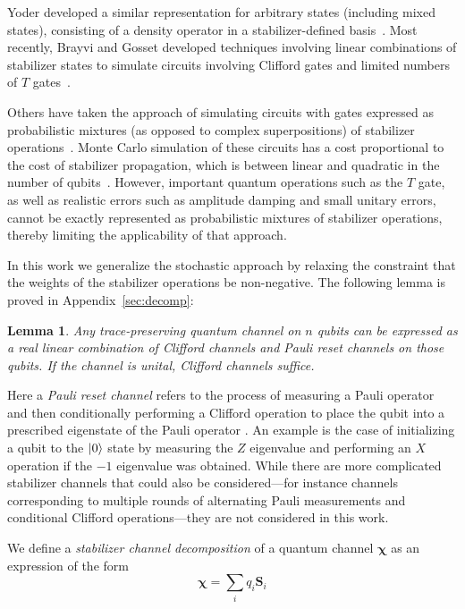 \documentclass[twocolumn,pra]{revtex4}
\newtheorem{lemma}{Lemma}
\newcommand{\bs}[1]{\boldsymbol{#1}}
\begin{document}
Yoder developed a similar representation for arbitrary states (including mixed states), consisting of a density operator in a stabilizer-defined basis~\cite{Yoder2012}. Most recently, Brayvi and Gosset developed techniques involving linear combinations of stabilizer states to simulate circuits involving Clifford gates and limited numbers of $T$ gates~\cite{bravyi2016improved}. 
\par
Others have taken the approach of simulating circuits with gates expressed as probabilistic mixtures (as opposed to complex superpositions) of stabilizer operations~\cite{Gutierrez2013, Magesan2013,Puzzuoli2014,Gutierrez2015}. Monte Carlo simulation of these circuits has a cost proportional to the cost of stabilizer propagation, which is between linear and quadratic in the number of qubits~\cite{Aaronson2004}. However, important quantum operations such as the $T$ gate, as well as realistic errors such as amplitude damping and small unitary errors, cannot be exactly represented as probabilistic mixtures of stabilizer operations, thereby limiting the applicability of that approach.
\par
In this work we generalize the stochastic approach by relaxing the constraint that the weights of the stabilizer operations be non-negative. The following lemma is proved in Appendix~\ref{sec:decomp}:
\begin{lemma}
\label{thm:channel-representation}
Any trace-preserving quantum channel on $n$ qubits can be expressed as a real linear combination of Clifford channels and Pauli reset channels on those qubits. If the channel is unital, Clifford channels suffice.
\end{lemma}
\noindent Here a {\em Pauli reset channel} refers to the process of measuring a Pauli operator and then conditionally performing a Clifford operation to place the qubit into a prescribed eigenstate of the Pauli operator \cite{Gutierrez2013}. An example is the case of initializing a qubit to the ${\left\vert{0}\right\rangle}$ state by measuring the $Z$ eigenvalue and performing an $X$ operation if the $-1$ eigenvalue was obtained. While there are more complicated stabilizer channels that could also be considered---for instance channels corresponding to multiple rounds of alternating Pauli measurements and conditional Clifford operations---they are not considered in this work.
\par
We define a \emph{stabilizer channel decomposition} of a quantum channel $\bs{\chi}$ as an expression of the form 
\begin{equation}
\label{eq:1}
\bs{\chi}=\sum_{i} q_{i}\mathbf{S}_{i}
\end{equation}
\end{document}
